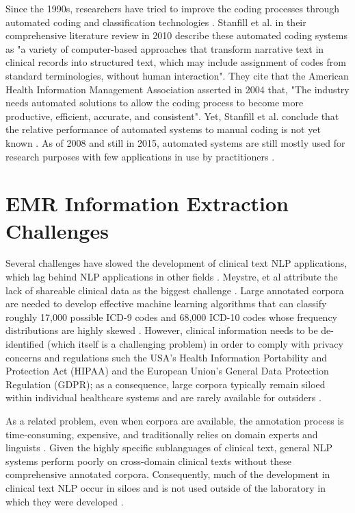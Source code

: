 \documentclass[sigconf]{acmart}
\begin{document}
Since the 1990s, researchers have tried to improve the coding processes through automated coding and classification technologies \cite{kavuluru2013unsupervised}. Stanfill et al. in their comprehensive literature review in 2010 describe these automated coding systems as "a variety of computer-based approaches that transform narrative text in clinical records into structured text, which may include assignment of codes from standard terminologies, without human interaction". They cite that the American Health Information Management Association asserted in 2004 that, "The industry needs automated solutions to allow the coding process to become more productive, efficient, accurate, and consistent". Yet, Stanfill et al. conclude that the relative performance of automated systems to manual coding is not yet known \cite{stanfill2010systematic}. As of 2008 and still in 2015, automated systems are still mostly used for research purposes with few applications in use by practitioners \cite{meystre2008extracting} \cite{velupillai2015recent}. 



\section{EMR Information Extraction Challenges}
Several challenges have slowed the development of clinical text NLP applications, which lag behind NLP applications in other fields \cite{chapman2011overcoming}. Meystre, et al attribute the lack of shareable clinical data as the biggest challenge \cite{meystre2008extracting}. Large annotated corpora are needed to develop effective machine learning algorithms that can classify roughly 17,000 possible ICD-9 codes and 68,000 ICD-10 codes whose frequency distributions are highly skewed \cite{berndorfer2017automated}. However, clinical information needs to be de-identified (which itself is a challenging problem) in order to comply with privacy concerns and regulations such the USA's Health Information Portability and Protection Act (HIPAA) and the European Union's General Data Protection Regulation (GDPR); as a consequence, large corpora typically remain siloed within individual healthcare systems and are rarely available for outsiders \cite{meystre2008extracting} \cite{stanfill2010systematic}.

As a related problem, even when corpora are available, the annotation process is time-consuming, expensive, and traditionally relies on domain experts and linguists \cite{meystre2008extracting} \cite{velupillai2015recent}. Given the highly specific sublanguages of clinical text, general NLP systems perform poorly on cross-domain clinical texts without these comprehensive annotated corpora. Consequently, much of the development in clinical text NLP occur in siloes and is not used outside of the laboratory in which they were developed \cite{chapman2011overcoming}.
\end{document}
